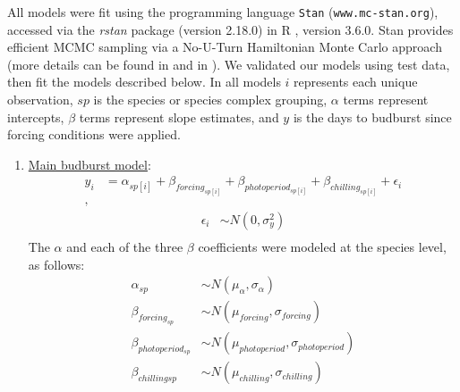 \documentclass{article}
\begin{document}
\par All models were fit using the programming language \texttt{Stan} \emph{\citep{Carpenter:2016aa}}(\texttt{www.mc-stan.org}), accessed via the \textit{rstan} package (version 2.18.0) in R \citep{Rcore:2017,rstan2018}, version 3.6.0. Stan provides efficient MCMC sampling via a No-U-Turn Hamiltonian Monte Carlo approach (more details can be found in \emph{\citep{BDA}} and in \emph{\citep{Carpenter:2016aa}}). We validated our models using test data, then fit the models described below. In all models $i$ represents each unique observation, $sp$ is the species or species complex grouping, $\alpha$ terms represent intercepts, $\beta$ terms represent slope estimates, and $y$ is the days to budburst since forcing conditions were applied.  
\begin{enumerate}
\item \underline{Main budburst model}:
\begin{align*}
y_i &= \alpha_{sp[i]} + \beta_{forcing_{sp[i]}} + \beta_{photoperiod_{sp[i]}} + \beta_{chilling_{sp[i]}} + \epsilon_i\\,
\end{align*}
\begin{align*}
\epsilon_i & \sim N(0,\sigma^2_y) \\
\end{align*}
\noindent The $\alpha$ and each of the three $\beta$ coefficients were modeled at the species level, as follows:
\begin{align*}
\alpha_{sp} & \sim N(\mu_{\alpha}, \sigma_{\alpha}) \\
\beta_{forcing_{sp}} & \sim N(\mu_{forcing}, \sigma_{forcing}) \\
\beta_{photoperiod_{sp}} & \sim N(\mu_{photoperiod}, \sigma_{photoperiod})\\
\beta_{chilling{sp}} & \sim N(\mu_{chilling}, \sigma_{chilling})
\end{align*}


\end{enumerate}
\end{document}
